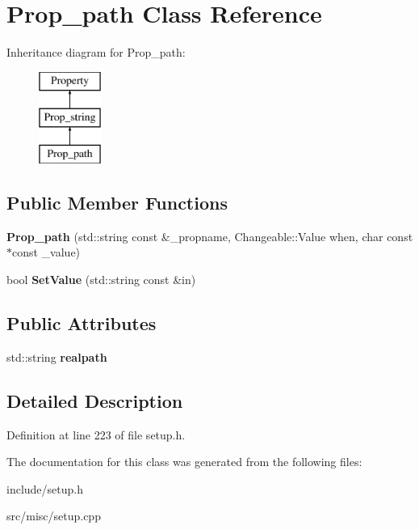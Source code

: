 \hypertarget{classProp__path}{\section{Prop\-\_\-path Class Reference}
\label{classProp__path}
}
Inheritance diagram for Prop\-\_\-path\-:\begin{figure}[H]
\begin{center}
\leavevmode
\includegraphics[height=3.000000cm]{classProp__path}
\end{center}
\end{figure}
\subsection*{Public Member Functions}
\begin{DoxyCompactItemize}
\item 
\hypertarget{classProp__path_a913eabbbfd399fed38f39381946e2eba}{{\bfseries Prop\-\_\-path} (std\-::string const \&\-\_\-propname, Changeable\-::\-Value when, char const $\ast$const \-\_\-value)}\label{classProp__path_a913eabbbfd399fed38f39381946e2eba}

\item 
\hypertarget{classProp__path_a0ba43ea1b4d1be0feb1ee6aa13428ed4}{bool {\bfseries Set\-Value} (std\-::string const \&in)}\label{classProp__path_a0ba43ea1b4d1be0feb1ee6aa13428ed4}

\end{DoxyCompactItemize}
\subsection*{Public Attributes}
\begin{DoxyCompactItemize}
\item 
\hypertarget{classProp__path_aa4281b80a9ba382027add3a82eecd7c3}{std\-::string {\bfseries realpath}}\label{classProp__path_aa4281b80a9ba382027add3a82eecd7c3}

\end{DoxyCompactItemize}


\subsection{Detailed Description}


Definition at line 223 of file setup.\-h.



The documentation for this class was generated from the following files\-:\begin{DoxyCompactItemize}
\item 
include/setup.\-h\item 
src/misc/setup.\-cpp\end{DoxyCompactItemize}
